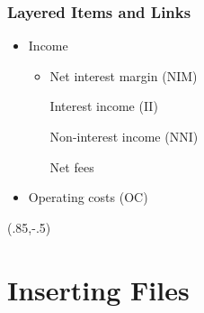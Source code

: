 \documentclass[12pt, aspectratio=169, xcolor=dvipsnames]{beamer}  %
\begin{document}
\begin{frame}[label=LinkB]
	\frametitle{Layered Items and Links}
	\begin{itemize}
		\item Income
		\begin{itemize}
				\item Net interest margin (NIM)
				\begin{itemize}
					\iftoggle{struct}{\item<2->}{\item} Interest income (II)
				\end{itemize}
				\iftoggle{struct}{\item<1->}{\item} Non-interest income (NNI)
				\begin{itemize}
					\iftoggle{long}{\item<2>}{\item} Net fees
				\end{itemize}
		\end{itemize}
		\item Operating costs (OC)
	\end{itemize}
	\begin{textblock*}{3cm}(.85\textwidth,-.5\textheight)
		\hyperlink{LinkA}{}
	\end{textblock*}
\end{frame}

\section{Inserting Files}

%
\end{document}
